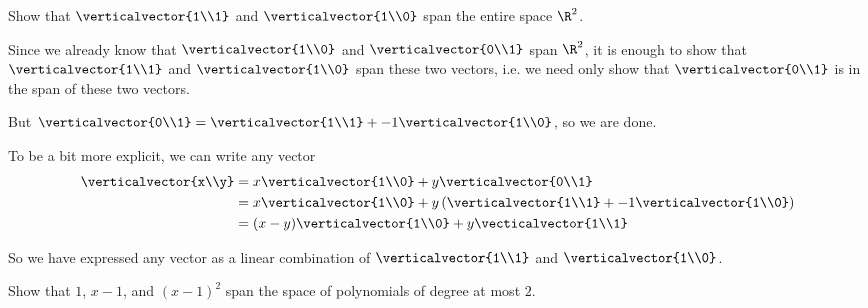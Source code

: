 \documentclass{ximera}
\begin{document}
 	Show that $\verticalvector{1\\1}$ and $\verticalvector{1\\0}$ span the entire space $\R^2$.

\begin{free-response}
	Since we already know that $\verticalvector{1\\0}$ and $\verticalvector{0\\1}$ span $\R^2$,
	 it is enough to show that $\verticalvector{1\\1}$ and $\verticalvector{1\\0}$ span these two vectors, i.e.
	 we need only show that $\verticalvector{0\\1}$ is in the span of these two vectors.
	 
	 But $\verticalvector{0\\1} = \verticalvector{1\\1} +-1\verticalvector{1\\0}$, so we are done.
	 
	 To be a bit more explicit, we can write any vector \begin{align*}
	 \verticalvector{x\\y} &= x\verticalvector{1\\0}+ y\verticalvector{0\\1}\\
	 &= x\verticalvector{1\\0}+ y\left(\verticalvector{1\\1} +-1\verticalvector{1\\0}\right)\\
	 &=(x-y)\verticalvector{1\\0}+y\vecticalvector{1\\1}
	 \end{align*}
	 
	 So we have expressed any vector as a linear combination of $\verticalvector{1\\1}$ and $\verticalvector{1\\0}$.
\end{free-response} 

 
 	Show that $1$, $x-1$, and $(x-1)^2$  span the space of polynomials of degree at most $2$.
\end{document}
